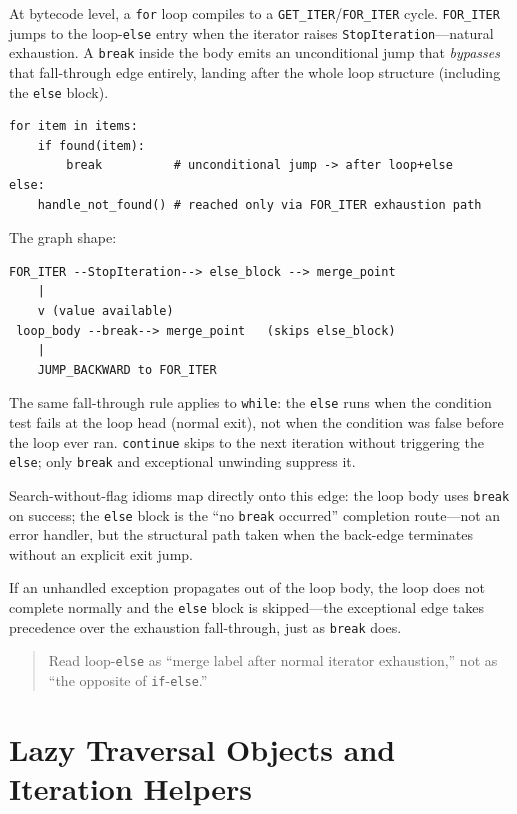\documentclass[a4paper,twoside]{report}
\begin{document}
At bytecode level, a \texttt{for} loop compiles to a \texttt{GET\_ITER}/\texttt{FOR\_ITER} cycle. \texttt{FOR\_ITER} jumps to the loop-\texttt{else} entry when the iterator raises \texttt{StopIteration}---natural exhaustion. A \texttt{break} inside the body emits an unconditional jump that \emph{bypasses} that fall-through edge entirely, landing after the whole loop structure (including the \texttt{else} block).

\begin{verbatim}
for item in items:
    if found(item):
        break          # unconditional jump -> after loop+else
else:
    handle_not_found() # reached only via FOR_ITER exhaustion path
\end{verbatim}

The graph shape:

\begin{verbatim}
FOR_ITER --StopIteration--> else_block --> merge_point
    |
    v (value available)
 loop_body --break--> merge_point   (skips else_block)
    |
    JUMP_BACKWARD to FOR_ITER
\end{verbatim}

The same fall-through rule applies to \texttt{while}: the \texttt{else} runs when the condition test fails at the loop head (normal exit), not when the condition was false before the loop ever ran. \texttt{continue} skips to the next iteration without triggering the \texttt{else}; only \texttt{break} and exceptional unwinding suppress it.

Search-without-flag idioms map directly onto this edge: the loop body uses \texttt{break} on success; the \texttt{else} block is the ``no \texttt{break} occurred'' completion route---not an error handler, but the structural path taken when the back-edge terminates without an explicit exit jump.

If an unhandled exception propagates out of the loop body, the loop does not complete normally and the \texttt{else} block is skipped---the exceptional edge takes precedence over the exhaustion fall-through, just as \texttt{break} does.

\begin{quote}
Read loop-\texttt{else} as ``merge label after normal iterator exhaustion,'' not as ``the opposite of \texttt{if}-\texttt{else}.''
\end{quote}


\section{Lazy Traversal Objects and Iteration Helpers}
\end{document}
